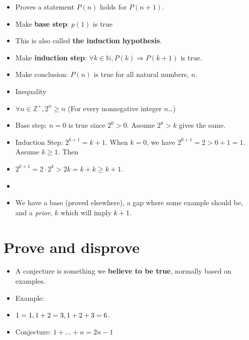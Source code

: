 \documentclass[english,10pt,a4paper]{article}
\begin{document}
\begin{theo} 
\begin{itemize}
\item Proves a statement $P(n)$ holds for $P(n+1)$.
\item Make \textbf{base step}: $p(1)$ is true
\item[] This is also called \textbf{the induction hypothesis}.
\item Make \textbf{induction step}: $\forall k \in \mathbb{N}, P(k) \Rightarrow P(k+1)$ is true.
\item Make conclusion: $P(n)$ is true for all natural numbers, $n$.
\end{itemize}
\end{theo}


\begin{theo} 
\begin{itemize}
\item Inequality
\item[] $\forall n \in \mathbb{Z}^+, 2^n \geq n$ (For every nonnegative integer $n$\dots)
\item[] Base step: $n=0$ is true since $2^0>0$. Assume $2^k>k$ gives the same.
\item[] Induction Step: $2^{k+1}=k+1$. When $k=0$, we have $2^{0+1}=2 > 0+1=1$. Assume $k\geq 1$. Then
\item[] $2^{k+1}=2\cdot 2^k > 2k=k+k \geq k+1$.
\end{itemize}
\end{theo}


\begin{theo} 
\begin{itemize}
\item 
\end{itemize}
\end{theo}



\begin{theo} 
\begin{itemize}
\item We have a base (proved elsewhere), a gap where some example should be, and a \textit{prior}, $k$ which will imply $k+1$.
\end{itemize}
\end{theo}


\newpage
\section{Prove and disprove}
\begin{theo}[Conjecture] 
\begin{itemize}
\item A conjecture is something we \textbf{believe to be true}, normally based on examples.
\item Example: 
\item[]$1=1, \\
1+2=3, \\
1+2+3=6$.
\item[] Conjecture: $1+\ldots+n=2n-1$
\end{itemize}
\end{theo}
\end{document}
